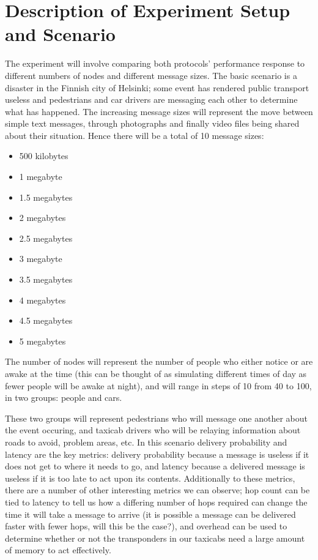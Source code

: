 \documentclass[12pt]{report}
\begin{document}
\section{Description of Experiment Setup and Scenario}

The experiment will involve comparing both protocols' performance response to different numbers of nodes and different message sizes.
The basic scenario is a disaster in the Finnish city of Helsinki; some event has rendered public transport useless and pedestrians and car drivers are messaging each other to determine what has happened.
The increasing message sizes will represent the move between simple text messages, through photographs and finally video files being shared about their situation.
Hence there will be a total of 10 message sizes:
\begin{itemize}
  \item 500 kilobytes
  \item 1 megabyte
  \item 1.5 megabytes
  \item 2 megabytes
  \item 2.5 megabytes
  \item 3 megabyte
  \item 3.5 megabytes
  \item 4 megabytes
  \item 4.5 megabytes
  \item 5 megabytes
\end{itemize}

The number of nodes will represent the number of people who either notice or are awake at the time (this can be thought of as simulating different times of day as fewer people will be awake at night), and will range in steps of 10 from 40 to 100, in two groups: people and cars.

These two groups will represent pedestrians who will message one another about the event occuring, and taxicab drivers who will be relaying information about roads to avoid, problem areas, etc.
In this scenario delivery probability and latency are the key metrics: delivery probability because a message is useless if it does not get to where it needs to go, and latency because a delivered message is useless if it is too late to act upon its contents.
Additionally to these metrics, there are a number of other interesting metrics we can observe; hop count can be tied to latency to tell us how a differing number of hops required can change the time it will take a message to arrive (it is possible a message can be delivered faster with fewer hops, will this be the case?), and overhead can be used to determine whether or not the transponders in our taxicabs need a large amount of memory to act effectively.
\end{document}
